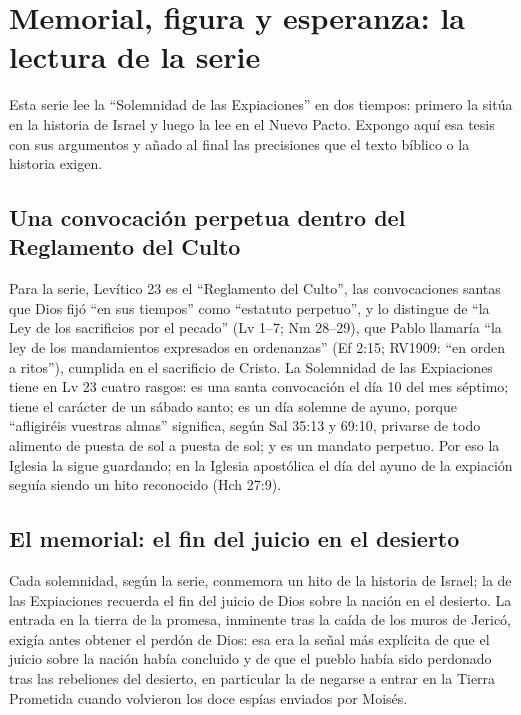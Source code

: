 \documentclass[11pt,letterpaper]{article}
\begin{document}
\section{Memorial, figura y esperanza: la lectura de la serie}\label{sec:serie}

Esta serie lee la ``Solemnidad de las Expiaciones'' en dos tiempos: primero la sitúa en la historia de Israel y luego la lee en el Nuevo Pacto. Expongo aquí esa tesis con sus argumentos y añado al final las precisiones que el texto bíblico o la historia exigen.

\subsection{Una convocación perpetua dentro del Reglamento del Culto}
Para la serie, Levítico 23 es el ``Reglamento del Culto'', las convocaciones santas que Dios fijó ``en sus tiempos'' como ``estatuto perpetuo'', y lo distingue de ``la Ley de los sacrificios por el pecado'' (Lv 1--7; Nm 28--29), que Pablo llamaría ``la ley de los mandamientos expresados en ordenanzas'' (Ef 2:15; RV1909: ``en orden a ritos''), cumplida en el sacrificio de Cristo. La Solemnidad de las Expiaciones tiene en Lv 23 cuatro rasgos: es una santa convocación el día 10 del mes séptimo; tiene el carácter de un sábado santo; es un día solemne de ayuno, porque ``afligiréis vuestras almas'' significa, según Sal 35:13 y 69:10, privarse de todo alimento de puesta de sol a puesta de sol; y es un mandato perpetuo. Por eso la Iglesia la sigue guardando; en la Iglesia apostólica el día del ayuno de la expiación seguía siendo un hito reconocido (Hch 27:9).

\subsection{El memorial: el fin del juicio en el desierto}
Cada solemnidad, según la serie, conmemora un hito de la historia de Israel; la de las Expiaciones recuerda el fin del juicio de Dios sobre la nación en el desierto. La entrada en la tierra de la promesa, inminente tras la caída de los muros de Jericó, exigía antes obtener el perdón de Dios: esa era la señal más explícita de que el juicio sobre la nación había concluido y de que el pueblo había sido perdonado tras las rebeliones del desierto, en particular la de negarse a entrar en la Tierra Prometida cuando volvieron los doce espías enviados por Moisés.
\end{document}
